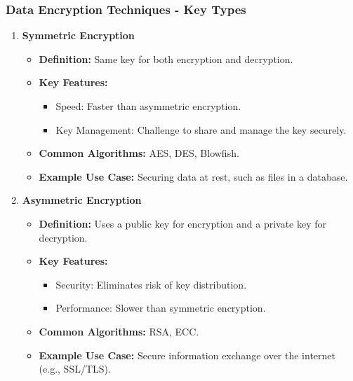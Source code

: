 \documentclass{beamer}
\begin{document}
\begin{frame}[fragile]
    \frametitle{Data Encryption Techniques - Key Types}
    \begin{enumerate}
        \item \textbf{Symmetric Encryption}
        \begin{itemize}
            \item \textbf{Definition:} Same key for both encryption and decryption.
            \item \textbf{Key Features:}
            \begin{itemize}
                \item Speed: Faster than asymmetric encryption.
                \item Key Management: Challenge to share and manage the key securely.
            \end{itemize}
            \item \textbf{Common Algorithms:} AES, DES, Blowfish.
            \item \textbf{Example Use Case:} Securing data at rest, such as files in a database.
        \end{itemize}
        \item \textbf{Asymmetric Encryption}
        \begin{itemize}
            \item \textbf{Definition:} Uses a public key for encryption and a private key for decryption.
            \item \textbf{Key Features:}
            \begin{itemize}
                \item Security: Eliminates risk of key distribution.
                \item Performance: Slower than symmetric encryption.
            \end{itemize}
            \item \textbf{Common Algorithms:} RSA, ECC.
            \item \textbf{Example Use Case:} Secure information exchange over the internet (e.g., SSL/TLS).
        \end{itemize}
    \end{enumerate}
\end{frame}
\end{document}
